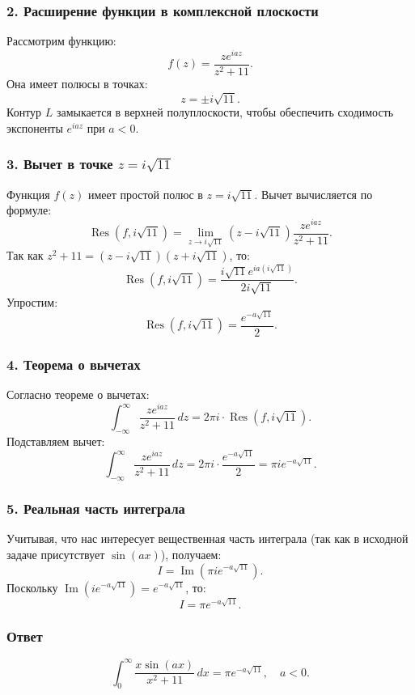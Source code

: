 \documentclass[a4paper,12pt]{article}
\begin{document}
\subsubsection*{2. Расширение функции в комплексной плоскости}
Рассмотрим функцию:
\[
f(z) = \frac{z e^{iaz}}{z^2 + 11}.
\]
Она имеет полюсы в точках:
\[
z = \pm i\sqrt{11}.
\]
Контур \(L\) замыкается в верхней полуплоскости, чтобы обеспечить сходимость экспоненты \(e^{iaz}\) при \(a < 0\).

\subsubsection*{3. Вычет в точке \(z = i\sqrt{11}\)}
Функция \(f(z)\) имеет простой полюс в \(z = i\sqrt{11}\). Вычет вычисляется по формуле:
\[
\operatorname{Res}(f, i\sqrt{11}) = \lim_{z \to i\sqrt{11}} (z - i\sqrt{11}) \frac{z e^{iaz}}{z^2 + 11}.
\]
Так как \(z^2 + 11 = (z - i\sqrt{11})(z + i\sqrt{11})\), то:
\[
\operatorname{Res}(f, i\sqrt{11}) = \frac{i\sqrt{11} e^{ia(i\sqrt{11})}}{2i\sqrt{11}}.
\]
Упростим:
\[
\operatorname{Res}(f, i\sqrt{11}) = \frac{e^{-a\sqrt{11}}}{2}.
\]

\subsubsection*{4. Теорема о вычетах}
Согласно теореме о вычетах:
\[
\int_{-\infty}^\infty \frac{z e^{iaz}}{z^2 + 11} \, dz = 2\pi i \cdot \operatorname{Res}(f, i\sqrt{11}).
\]
Подставляем вычет:
\[
\int_{-\infty}^\infty \frac{z e^{iaz}}{z^2 + 11} \, dz = 2\pi i \cdot \frac{e^{-a\sqrt{11}}}{2} = \pi i e^{-a\sqrt{11}}.
\]

\subsubsection*{5. Реальная часть интеграла}
Учитывая, что нас интересует вещественная часть интеграла (так как в исходной задаче присутствует \(\sin(ax)\)), получаем:
\[
I = \operatorname{Im} \left( \pi i e^{-a\sqrt{11}} \right).
\]
Поскольку \(\operatorname{Im}(i e^{-a\sqrt{11}}) = e^{-a\sqrt{11}}\), то:
\[
I = \pi e^{-a\sqrt{11}}.
\]

\subsubsection*{Ответ}
\[
\int_0^{\infty} \frac{x \sin(ax)}{x^2 + 11} \, dx = \pi e^{-a\sqrt{11}}, \quad a < 0.
\]
\end{document}

